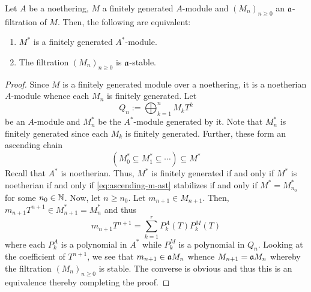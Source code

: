 \begin{proposition}
    Let $A$ be a noethering, $M$ a finitely generated $A$-module and $(M_n)_{n\ge 0}$ an $\mathfrak a$-filtration of $M$. Then, the following are equivalent: 
    \begin{enumerate}[label=(\alph*)]
        \item $M^*$ is a finitely generated $A^*$-module. 
        \item The filtration $(M_n)_{n\ge 0}$ is $\mathfrak a$-stable.
    \end{enumerate}
\end{proposition}
\begin{proof}
    Since $M$ is a finitely generated module over a noethering, it is a noetherian $A$-module whence each $M_n$ is finitely generated. Let 
    \begin{equation*}
        Q_n := \bigoplus_{k = 1}^n M_kT^k
    \end{equation*}
    be an $A$-module and $M_n^\ast$ be the $A^\ast$-module generated by it. Note that $M_n^\ast$ is finitely generated since each $M_k$ is finitely generated. Further, these form an ascending chain 
    \begin{equation}\label{eq:ascending-m-ast}
        \left(M_0^\ast\subseteq M_1^\ast\subseteq\cdots\right)\subseteq M^\ast\tag{$\dagger$}
    \end{equation}
    Recall that $A^\ast$ is noetherian. Thus, $M^\ast$ is finitely generated if and only if $M^\ast$ is noetherian if and only if \eqref{eq:ascending-m-ast} stabilizes if and only if $M^\ast = M_{n_0}^\ast$ for some $n_0\in\mathbb{N}$. Now, let $n\ge n_0$. Let $m_{n + 1}\in M_{n + 1}$. Then, $m_{n + 1}T^{n + 1}\in M_{n + 1}^\ast = M_n^\ast$ and thus 
    \begin{equation*}
        m_{n + 1}T^{n + 1} = \sum_{k = 1}^r P^A_k(T)P^M_k(T)
    \end{equation*}
    where each $P^A_k$ is a polynomial in $A^\ast$ while $P^M_k$ is a polynomial in $Q_n$. Looking at the coefficient of $T^{n + 1}$, we see that $m_{n + 1}\in\mathfrak a M_n$ whence $M_{n + 1} = \mathfrak a M_n$ whereby the filtration $(M_n)_{n\ge 0}$ is stable. The converse is obvious and thus this is an equivalence thereby completing the proof.
\end{proof}

